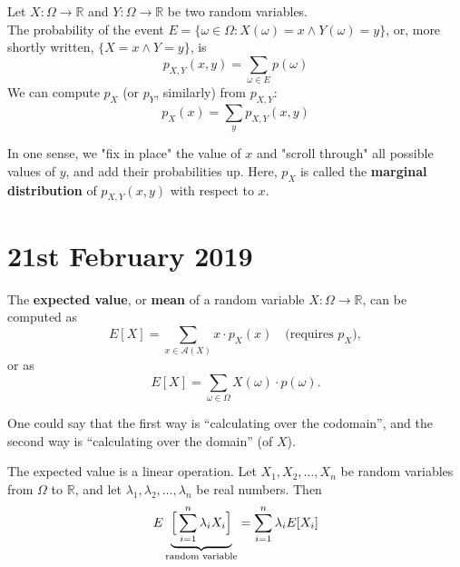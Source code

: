 \documentclass{report}
\begin{document}
\begin{defn}
	Let $X: \Omega \to \mathbb{R}$ and $Y: \Omega \to \mathbb{R}$ be two random variables. \\
	The probability of the event $E = \{\omega \in \Omega : X(\omega) = x \land Y(\omega) = y\}$, or, more shortly written, $\{X = x \land Y = y\}$, is
	\begin{equation}
		p_{X, Y}(x, y) = \sum_{\omega \in E} p(\omega)
	\end{equation}
	We can compute $p_X$ (or $p_Y$, similarly) from $p_{X, Y}$:
	\begin{equation}
		p_X(x) = \sum_y p_{X, Y}(x, y)
	\end{equation}
\end{defn}
In one sense, we "fix in place" the value of $x$ and "scroll through" all possible values of $y$, and add their probabilities up. Here, $p_X$ is called the \textbf{marginal distribution} of $p_{X, Y}(x, y)$ with respect to $x$.

\section{21st February 2019}

\begin{defn}
The \textbf{expected value}, or \textbf{mean} of a random variable $X: \Omega \to \mathbb{R}$, can be computed as
\begin{equation}
	E[X] = \sum_{x \in \mathcal A(X)} x \cdot p_X(x) \quad \text{(requires $p_X$)},
\end{equation}
or as
\begin{equation}
	E[X] = \sum_{\omega \in \Omega} X(\omega) \cdot p(\omega).
\end{equation}
\end{defn}
One could say that the first way is ``calculating over the codomain'', and the second way is ``calculating over the domain'' (of $X$). 

\begin{remark} The expected value is a linear operation. Let $X_1, X_2, \dots, X_n$ be random variables from $\Omega$ to $\mathbb{R}$, and let $\lambda_1, \lambda_2, \dots, \lambda_n$ be real numbers. Then
\begin{equation}
	E\underbrace{\Bigr[\sum_{i=1}^n \lambda_i X_i\Bigl]}_{\text{random variable}} = \sum_{i=1}^n \lambda_i E[X_i]
\end{equation}
\end{remark}
\end{document}
